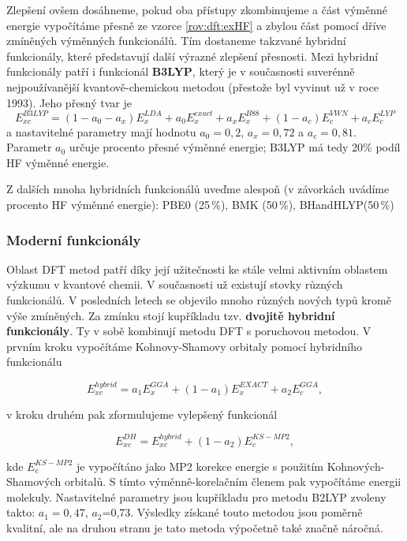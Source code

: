 Zlepšení ovšem dosáhneme, pokud oba přístupy zkombinujeme a část výměnné energie vypočítáme přesně ze vzorce \ref{rov:dft:exHF} a zbylou část pomocí dříve zmíněných výměnných funkcionálů. Tím dostaneme takzvané hybridní funkcionály, které představují další výrazné zlepšení přesnosti.
Mezi hybridní funkcionály patří i funkcionál \textbf{B3LYP}, který je v současnosti suverénně nejpoužívanější kvantově-chemickou metodou (přestože byl vyvinut už v roce 1993).
Jeho přesný tvar je
\begin{equation}
E_{xc}^{B3LYP}=(1-a_0-a_x)E_x^{LDA}+a_0E_x^{exact}+a_xE_x^{B88}+(1-a_c)E_c^{VWN}+a_c E_c^{LYP}
\end{equation}
a nastavitelné parametry mají hodnotu $a_0=0{,}2$, $a_x=0{,}72$ a $a_c=0{,}81$.
Parametr $a_0$ určuje procento přesné výměnné energie; B3LYP má tedy 20\% podíl HF výměnné energie.

Z dalších mnoha hybridních funkcionálů uveďme alespoň (v závorkách uvádíme procento HF výměnné energie): PBE0 (25\,\%), BMK (50\,\%), BHandHLYP(50\,\%)

\subsubsection{Moderní funkcionály}
Oblast DFT metod patří díky její užitečnosti ke stále velmi aktivním oblastem výzkumu v kvantové chemii. V současnosti už existují stovky různých funkcionálů. V posledních letech se objevilo mnoho různých nových typů kromě výše zmíněných. Za zmínku stojí kupříkladu tzv. \textbf{dvojitě hybridní funkcionály}. Ty v sobě kombinují metodu DFT s poruchovou metodou. V prvním kroku vypočítáme Kohnovy-Shamovy orbitaly pomocí hybridního funkcionálu

\begin{equation}
E_{xc}^{hybrid}=a_1E_x^{GGA}+(1-a_1)E_x^{EXACT}+a_2E_c^{GGA},
\end{equation}

v kroku druhém pak zformulujeme vylepšený funkcionál

\begin{equation}
E_{xc}^{DH}=E_{xc}^{hybrid}+(1-a_2)E_c^{KS-MP2},
\end{equation}

kde $E_c^{KS-MP2}$ je vypočítáno jako MP2 korekce energie s použitím Kohnových-Shamových orbitalů. S tímto výměnně-korelačním členem pak vypočítáme energii molekuly. Nastavitelné parametry jsou kupříkladu pro metodu B2LYP zvoleny takto: $a_1=0,47$, $a_2$=0,73.
Výsledky získané touto metodou jsou poměrně kvalitní, ale na druhou stranu je tato metoda výpočetně také značně náročná.

